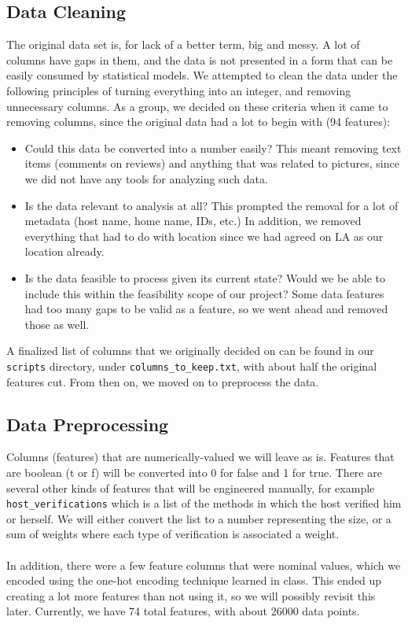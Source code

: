 \documentclass{article}
\begin{document}
\subsection{Data Cleaning}
The original data set is, for lack of a better term, big and messy. A lot of columns have gaps in them, and the data is not presented in a form that can be easily consumed by statistical models. We attempted to clean the data under the following principles of turning everything into an integer, and removing unnecessary columns. As a group, we decided on these criteria when it came to removing columns, since the original data had a lot to begin with (94 features):

\begin{itemize}
	\item Could this data be converted into a number easily? This meant removing text items (comments on reviews) and anything that was related to pictures, since we did not have any tools for analyzing such data.
    \item Is the data relevant to analysis at all? This prompted the removal for a lot of metadata (host name, home name, IDs, etc.) In addition, we removed everything that had to do with location since we had agreed on LA as our location already.
    \item Is the data feasible to process given its current state? Would we be able to include this within the feasibility scope of our project? Some data features had too many gaps to be valid as a feature, so we went ahead and removed those as well.
\end{itemize}

A finalized list of columns that we originally decided on can be found in our \texttt{scripts} directory, under \texttt{columns\_to\_keep.txt}, with about half the original features cut. From then on, we moved on to preprocess the data.

\subsection{Data Preprocessing}
Columns (features) that are numerically-valued we will leave as is. Features that are boolean (t or f) will be converted into 0 for false and 1 for true. There are several other kinds of features that will be engineered manually, for example \texttt{host\_verifications} which is a list of the methods in which the host verified him or herself. We will either convert the list to a number representing the size, or a sum of weights where each type of verification is associated a weight.
\\ \\
In addition, there were a few feature columns that were nominal values, which we encoded using the one-hot encoding technique learned in class. This ended up creating a lot more features than not using it, so we will possibly revisit this later. Currently, we have 74 total features, with about 26000 data points.
\end{document}
